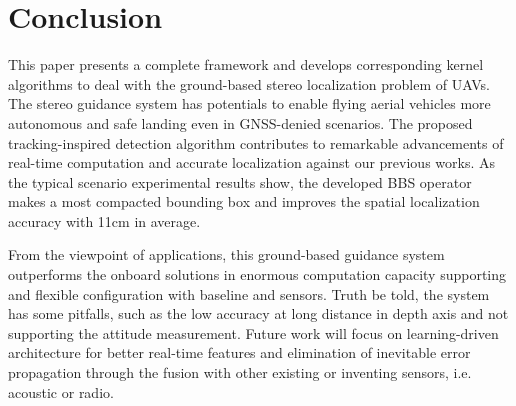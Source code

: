 



\section{Conclusion}
This paper presents a complete framework and develops corresponding kernel algorithms to deal with the ground-based stereo localization problem of UAVs. The stereo guidance system has potentials to enable flying aerial vehicles more autonomous and safe landing even in GNSS-denied scenarios. The proposed tracking-inspired detection algorithm contributes to remarkable advancements of real-time computation and accurate localization against our previous works. As the typical scenario experimental results show, the developed BBS operator makes a most compacted bounding box and improves the spatial localization accuracy with 11cm in average. 

From the viewpoint of applications, this ground-based guidance system outperforms the onboard solutions in enormous computation capacity supporting and flexible configuration with baseline and sensors. Truth be told, the system has some pitfalls, such as the low accuracy at long distance in depth axis and not supporting the attitude measurement. Future work will focus on learning-driven architecture for better real-time features and elimination of inevitable error propagation through the fusion with other existing or inventing sensors, i.e. acoustic or radio.


